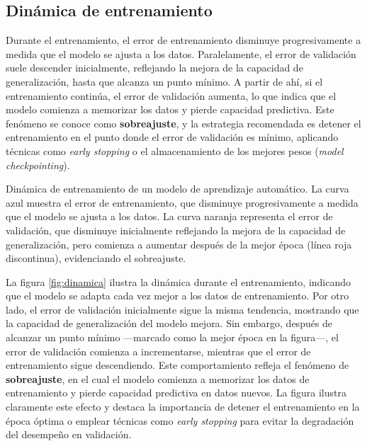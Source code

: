 \documentclass[letterpaper,12pt, twoside]{report}
\providecommand{\DIFdeltex}[1]{{\protect\color{red} \scriptsize #1}} %
\providecommand{\DIFdelFL}[1]{\DIFdel{#1}} %
\providecommand{\DIFdel}[1]{\texorpdfstring{\DIFdeltex{#1}}{}} %
\begin{document}
\subsection*{\DIFdel{Dinámica de entrenamiento}}
\DIFdel{Durante el entrenamiento, el error de entrenamiento disminuye progresivamente a medida que el modelo se ajusta a los datos. Paralelamente, el error de validación suele descender inicialmente, reflejando la mejora de la capacidad de generalización, hasta que alcanza un punto mínimo. A partir de ahí, si el entrenamiento continúa, el error de validación aumenta, lo que indica que el modelo comienza a memorizar los datos y pierde capacidad predictiva. Este fenómeno se conoce como \textbf{sobreajuste}, y la estrategia recomendada es detener el entrenamiento en el punto donde el error de validación es mínimo, aplicando técnicas como \textit{early stopping} o el almacenamiento de los mejores pesos (\textit{model checkpointing}).
}%

{%
\DIFdelFL{Dinámica de entrenamiento de un modelo de aprendizaje automático. La curva azul muestra el error de entrenamiento, que disminuye progresivamente a medida que el modelo se ajusta a los datos. La curva naranja representa el error de validación, que disminuye inicialmente reflejando la mejora de la capacidad de generalización, pero comienza a aumentar después de la mejor época (línea roja discontinua), evidenciando el sobreajuste.}}


\DIFdel{La figura \ref{fig:dinamica} ilustra la dinámica durante el entrenamiento, indicando que el modelo se adapta cada vez mejor a los datos de entrenamiento. Por otro lado, el error de validación inicialmente sigue la misma tendencia, mostrando que la capacidad de generalización del modelo mejora. Sin embargo, después de alcanzar un punto mínimo —marcado como la mejor época en la figura—, el error de validación comienza a incrementarse, mientras que el error de entrenamiento sigue descendiendo. Este comportamiento refleja el fenómeno de \textbf{sobreajuste}, en el cual el modelo comienza a memorizar los datos de entrenamiento y pierde capacidad predictiva en datos nuevos. La figura ilustra claramente este efecto y destaca la importancia de detener el entrenamiento en la época óptima o emplear técnicas como \textit{early stopping} para evitar la degradación del desempeño en validación.
}%
\end{document}
